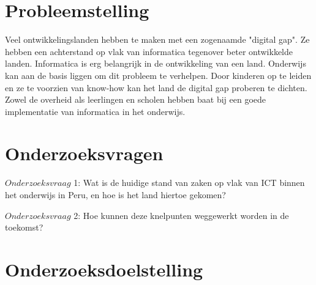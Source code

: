 \section{Probleemstelling}
\label{sec:probleemstelling}
Veel ontwikkelingslanden hebben te maken met een zogenaamde "digital gap". Ze hebben een achterstand op vlak van informatica tegenover beter ontwikkelde landen. Informatica is erg belangrijk in de ontwikkeling van een land. Onderwijs kan aan de basis liggen om dit probleem te verhelpen. Door kinderen op te leiden en ze te voorzien van know-how kan het land de digital gap proberen te dichten. Zowel de overheid als leerlingen en scholen hebben baat bij een goede implementatie van informatica in het onderwijs. 


\section{Onderzoeksvragen}
\label{sec:onderzoeksvraag}


$Onderzoeksvraag$ 1: Wat is de huidige stand van zaken op vlak van ICT binnen het onderwijs in Peru, en hoe is het land hiertoe gekomen?

$Onderzoeksvraag$ 2: Hoe kunnen deze knelpunten weggewerkt worden in de toekomst?

\section{Onderzoeksdoelstelling}
\label{sec:onderzoeksdoelstelling}

